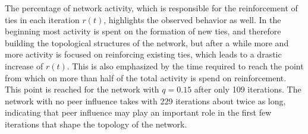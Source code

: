 The percentage of network activity, which is responsible for the reinforcement of ties in each iteration \( r(t) \), highlights the observed behavior as well.
In the beginning most activity is spent on the formation of new ties, and therefore building the topological structures of the network, but after a while more and more activity is focused on reinforcing existing ties, which leads to a drastic increase of \( r(t) \).
This is also emphasized by the time required to reach the point from which on more than half of the total activity is spend on reinforcement.
This point is reached for the network with \( q = 0.15 \) after only 109 iterations.
The network with no peer influence takes with 229 iterations about twice as long, indicating that peer influence may play an important role in the first few iterations that shape the topology of the network.


